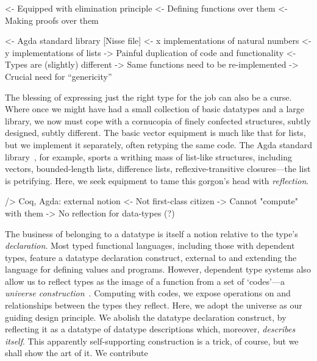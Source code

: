\documentclass[preprint
              , authoryear
              ]{sigplanconf}
\newenvironment{wstructure}{\comment}{\endcomment}
\begin{document}
\begin{wstructure}
        <- Equipped with elimination principle
            <- Defining functions over them
            <- Making proofs over them
\end{wstructure}


\begin{wstructure}
    <- Agda standard library [Nisse file]
        <- x implementations of natural numbers
        <- y implementations of lists
        -> Painful duplication of code and functionality
            <- Types are (slightly) different
                -> Same functions need to be re-implemented 
        -> Crucial need for ``genericity''
\end{wstructure}

The blessing of expressing just the right type for the job can also be
a curse. Where once we might have had a small collection of basic
datatypes and a large library, we now must cope with a cornucopia of
finely confected structures, subtly designed, subtly different. The
basic vector equipment is much like that for lists, but we implement
it separately, often retyping the same code. The Agda standard
library~\cite{nisse:asl}, for example, sports a writhing mass of
list-like structures, including vectors, bounded-length lists,
difference lists, reflexive-transitive closures---the list is
petrifying. Here, we seek equipment to tame this gorgon's head with
\emph{reflection}.

\begin{wstructure}
        /> Coq, Agda: external notion
            <- Not first-class citizen
            -> Cannot "compute" with them
            -> No reflection for data-types (?)
\end{wstructure}

The business of belonging to a datatype is itself a notion
relative to the type's \emph{declaration}. Most typed functional
languages, including those with dependent types, feature a datatype
declaration construct, external to and extending the language for
defining values and programs. However, dependent type systems also
allow us to reflect types as the image of a function from a set of
`codes'---a \emph{universe construction}~\cite{martin-lof:itt}. 
Computing with codes, we expose operations on and
relationships between the types they reflect. Here, we adopt
the universe as our guiding design principle. We abolish the
datatype declaration construct, by reflecting it as a datatype of
datatype descriptions which, moreover, \emph{describes itself}. This
apparently self-supporting construction is a trick, of course, but
we shall show the art of it. We contribute
\end{document}
